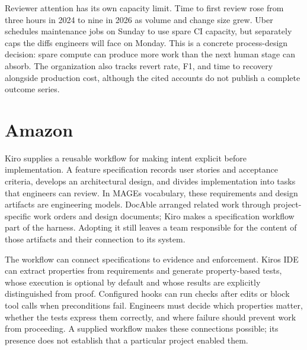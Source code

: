 
Reviewer attention has its own capacity limit. Time to first review rose from three hours in 2024 to nine in 2026 as volume and change size grew\citep{bond2026ureview}. Uber schedules maintenance jobs on Sunday to use spare CI capacity, but separately caps the diffs engineers will face on Monday\citep{medisetty2026sdlc}. This is a concrete process-design decision: spare compute can produce more work than the next human stage can absorb. The organization also tracks revert rate, F1, and time to recovery alongside production cost, although the cited accounts do not publish a complete outcome series.

\section{Amazon}\label{heading:amazon}


Kiro supplies a reusable workflow for making intent explicit before implementation. A feature specification records user stories and acceptance criteria, develops an architectural design, and divides implementation into tasks that engineers can review\citep{kiro2026specs}. In MAGE\textquotesingle s vocabulary, these requirements and design artifacts are engineering models. DocAble arranged related work through project-specific work orders and design documents; Kiro makes a specification workflow part of the harness. Adopting it still leaves a team responsible for the content of those artifacts and their connection to its system.


The workflow can connect specifications to evidence and enforcement. Kiro\textquotesingle s IDE can extract properties from requirements and generate property-based tests, whose execution is optional by default and whose results are explicitly distinguished from proof\citep{kiro2026correctness}. Configured hooks can run checks after edits or block tool calls when preconditions fail\citep{kiro2026hooks}. Engineers must decide which properties matter, whether the tests express them correctly, and where failure should prevent work from proceeding. A supplied workflow makes these connections possible; its presence does not establish that a particular project enabled them.

